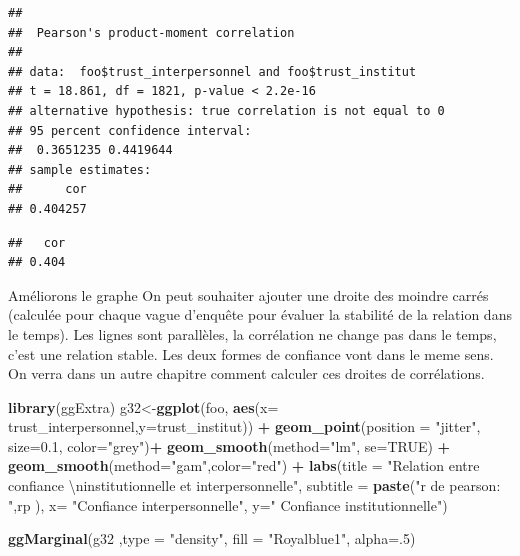 \documentclass[
]{book}
\newenvironment{Shaded}{\begin{snugshade}}{\end{snugshade}}
\newcommand{\CharTok}[1]{\textcolor[rgb]{0.31,0.60,0.02}{#1}}
\newcommand{\DataTypeTok}[1]{\textcolor[rgb]{0.13,0.29,0.53}{#1}}
\newcommand{\DecValTok}[1]{\textcolor[rgb]{0.00,0.00,0.81}{#1}}
\newcommand{\FloatTok}[1]{\textcolor[rgb]{0.00,0.00,0.81}{#1}}
\newcommand{\KeywordTok}[1]{\textcolor[rgb]{0.13,0.29,0.53}{\textbf{#1}}}
\newcommand{\NormalTok}[1]{#1}
\newcommand{\OperatorTok}[1]{\textcolor[rgb]{0.81,0.36,0.00}{\textbf{#1}}}
\newcommand{\OtherTok}[1]{\textcolor[rgb]{0.56,0.35,0.01}{#1}}
\newcommand{\StringTok}[1]{\textcolor[rgb]{0.31,0.60,0.02}{#1}}
\begin{document}
\begin{verbatim}
## 
##  Pearson's product-moment correlation
## 
## data:  foo$trust_interpersonnel and foo$trust_institut
## t = 18.861, df = 1821, p-value < 2.2e-16
## alternative hypothesis: true correlation is not equal to 0
## 95 percent confidence interval:
##  0.3651235 0.4419644
## sample estimates:
##      cor 
## 0.404257
\end{verbatim}

\begin{Shaded}
\end{Shaded}

\begin{verbatim}
##   cor 
## 0.404
\end{verbatim}

Améliorons le graphe On peut souhaiter ajouter une droite des moindre carrés (calculée pour chaque vague d'enquête pour évaluer la stabilité de la relation dans le temps). Les lignes sont parallèles, la corrélation ne change pas dans le temps, c'est une relation stable. Les deux formes de confiance vont dans le meme sens. On verra dans un autre chapitre comment calculer ces droites de corrélations.

\begin{Shaded}
\begin{Highlighting}[]
\KeywordTok{library}\NormalTok{(ggExtra)}
\NormalTok{g32<-}\KeywordTok{ggplot}\NormalTok{(foo, }\KeywordTok{aes}\NormalTok{(}\DataTypeTok{x=}\NormalTok{ trust_interpersonnel,}\DataTypeTok{y=}\NormalTok{trust_institut)) }\OperatorTok{+}
\StringTok{  }\KeywordTok{geom_point}\NormalTok{(}\DataTypeTok{position =} \StringTok{"jitter"}\NormalTok{, }\DataTypeTok{size=}\FloatTok{0.1}\NormalTok{, }\DataTypeTok{color=}\StringTok{"grey"}\NormalTok{)}\OperatorTok{+}
\StringTok{  }\KeywordTok{geom_smooth}\NormalTok{(}\DataTypeTok{method=}\StringTok{"lm"}\NormalTok{, }\DataTypeTok{se=}\OtherTok{TRUE}\NormalTok{) }\OperatorTok{+}
\StringTok{  }\KeywordTok{geom_smooth}\NormalTok{(}\DataTypeTok{method=}\StringTok{"gam"}\NormalTok{,}\DataTypeTok{color=}\StringTok{"red"}\NormalTok{)     }\OperatorTok{+}
\StringTok{  }\KeywordTok{labs}\NormalTok{(}\DataTypeTok{title =} \StringTok{"Relation entre confiance }\CharTok{\textbackslash{}n}\StringTok{institutionnelle et interpersonnelle"}\NormalTok{, }
       \DataTypeTok{subtitle =} \KeywordTok{paste}\NormalTok{(}\StringTok{"r de pearson: "}\NormalTok{,rp ),}
       \DataTypeTok{x=} \StringTok{"Confiance interpersonnelle"}\NormalTok{,}
       \DataTypeTok{y=}\StringTok{" Confiance institutionnelle"}\NormalTok{)}

\KeywordTok{ggMarginal}\NormalTok{(g32  ,}\DataTypeTok{type =} \StringTok{"density"}\NormalTok{, }\DataTypeTok{fill =} \StringTok{"Royalblue1"}\NormalTok{, }\DataTypeTok{alpha=}\NormalTok{.}\DecValTok{5}\NormalTok{)}
\end{Highlighting}
\end{Shaded}
\end{document}
